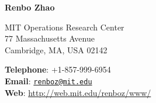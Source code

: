 \documentclass[11pt]{article}
\begin{document}
 
\begin{center}
\textbf{\large Renbo Zhao}\\
\end{center}

\begin{minipage}[t]{0.5\textwidth}
MIT Operations Research Center\\
77 Massachusetts Avenue\\
Cambridge, MA, USA 02142
\end{minipage}
\hspace{.5cm}
\begin{minipage}[t]{0.5\textwidth}
\textbf{Telephone}: +1-857-999-6954\\
\textbf{Email}: \href{mailto:}{\tt renboz@mit.edu}\\
\textbf{Web}: \url{http://web.mit.edu/renboz/www/}
\end{minipage} \newline\newline


\vspace{-1em}
\setlength{\leftskip}{3ex}
\end{document}
